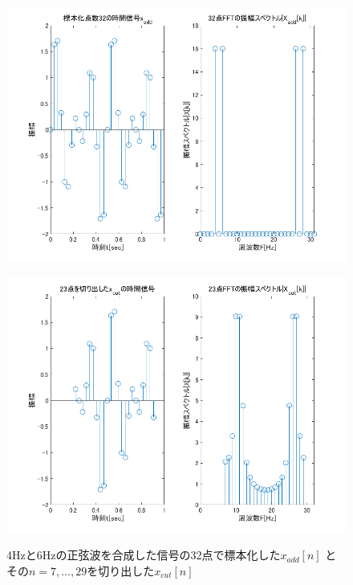 \documentclass[11pt, a4paper, titlepage]{ltjsarticle}
\begin{document}
\begin{figure}[h]
    \begin{center}
    \begin{minipage}[t]{0.48\columnwidth}
        \includegraphics[width=\columnwidth]{figures/3-3-org.png}
        \label{fign:3-3-org}
    \end{minipage}
    \begin{minipage}[t]{0.48\columnwidth}
        \includegraphics[width=\columnwidth]{figures/3-3-cut.png}
        \label{fign:3-3-cut}
    \end{minipage}
    \end{center}
    \caption{4Hzと6Hzの正弦波を合成した信号の32点で標本化した$x_{add}[n]$
    とその$n=7,\dots,29$を切り出した$x_{cut}[n]$}
\end{figure}
\end{document}
